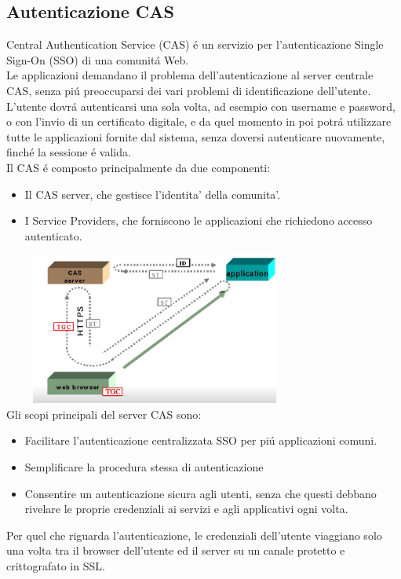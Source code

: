 \documentclass[a4paper, 12 pt, italian]{report}
\begin{document}
\subsection{Autenticazione CAS}
Central Authentication Service (CAS) \'e un servizio per l'autenticazione Single Sign-On (SSO) di una comunit\'a Web.\\
Le applicazioni demandano il problema dell'autenticazione al server centrale CAS, senza pi\'u preoccuparsi dei vari problemi di identificazione dell'utente.\\
L'utente dovr\'a autenticarsi una sola volta, ad esempio con username e password, o con l'invio di un certificato digitale, e da quel momento in poi potr\'a utilizzare tutte le applicazioni fornite dal sistema, senza doversi autenticare nuovamente, finch\'e la sessione \'e valida.\\
Il CAS \'e composto principalmente da due componenti:
\begin{itemize}
\item Il CAS server, che gestisce l'identita' della comunita'.
\item I Service Providers, che forniscono le applicazioni che richiedono accesso autenticato.
\end{itemize}
\includegraphics[height=50mm, width=100mm]{cas}\\
Gli scopi principali del server CAS sono:
\begin{itemize}
\item Facilitare l'autenticazione centralizzata SSO per pi\'u applicazioni comuni.
\item Semplificare la procedura stessa di autenticazione
\item Consentire un autenticazione sicura agli utenti, senza che questi debbano
rivelare le proprie credenziali ai servizi e agli applicativi ogni volta.
\end{itemize}
Per quel che riguarda l'autenticazione, le credenziali dell'utente viaggiano solo una volta tra il browser dell'utente ed il server su un canale protetto e crittografato in SSL. \\
\end{document}
